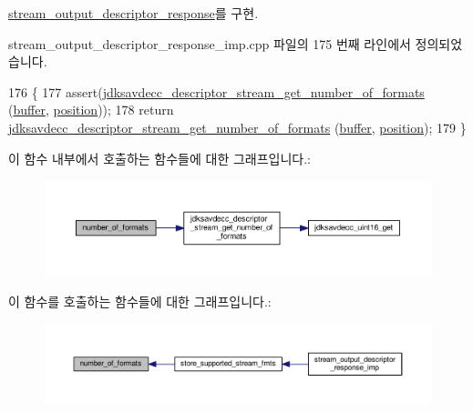 \hyperlink{classavdecc__lib_1_1stream__output__descriptor__response_a55d221ca29bf6acce7d7031b811bae01}{stream\+\_\+output\+\_\+descriptor\+\_\+response}를 구현.



stream\+\_\+output\+\_\+descriptor\+\_\+response\+\_\+imp.\+cpp 파일의 175 번째 라인에서 정의되었습니다.


\begin{DoxyCode}
176 \{
177     assert(\hyperlink{group__descriptor__stream_gaeb76e60867af744978aafba4150e1f83}{jdksavdecc\_descriptor\_stream\_get\_number\_of\_formats}
      (\hyperlink{classavdecc__lib_1_1descriptor__response__base__imp_a56ed84df35de10bdb65e72b184309497}{buffer}, \hyperlink{classavdecc__lib_1_1descriptor__response__base__imp_a7a04afe5347934be732ec70a70bd0a28}{position}));
178     \textcolor{keywordflow}{return} \hyperlink{group__descriptor__stream_gaeb76e60867af744978aafba4150e1f83}{jdksavdecc\_descriptor\_stream\_get\_number\_of\_formats}
      (\hyperlink{classavdecc__lib_1_1descriptor__response__base__imp_a56ed84df35de10bdb65e72b184309497}{buffer}, \hyperlink{classavdecc__lib_1_1descriptor__response__base__imp_a7a04afe5347934be732ec70a70bd0a28}{position});
179 \}
\end{DoxyCode}


이 함수 내부에서 호출하는 함수들에 대한 그래프입니다.\+:
\nopagebreak
\begin{figure}[H]
\begin{center}
\leavevmode
\includegraphics[width=350pt]{classavdecc__lib_1_1stream__output__descriptor__response__imp_a159e8e8c593b548faf249fc404afa7e3_cgraph}
\end{center}
\end{figure}




이 함수를 호출하는 함수들에 대한 그래프입니다.\+:
\nopagebreak
\begin{figure}[H]
\begin{center}
\leavevmode
\includegraphics[width=350pt]{classavdecc__lib_1_1stream__output__descriptor__response__imp_a159e8e8c593b548faf249fc404afa7e3_icgraph}
\end{center}
\end{figure}


